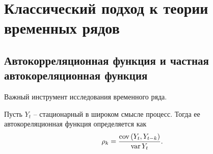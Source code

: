 \section{Классический подход к теории временных рядов}
    \subsection{Автокорреляционная функция и частная автокореляционная функция}
        Важный инструмент исследования временного ряда.
        \begin{definition}
            Пусть $Y_t$ -- стационарный в широком смысле процесс. Тогда ее автокореляционная функция определяется как 
            \begin{equation*}
                \rho_k = \frac{\operatorname*{cov} \left(Y_t, Y_{t-k}\right)}{\operatorname*{var} Y_t}.
            \end{equation*}
        \end{definition}

